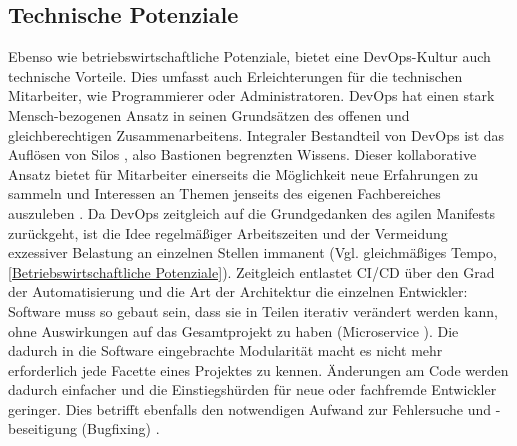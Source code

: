 \subsection{Technische Potenziale}
\label{Technische Potenziale}
Ebenso wie betriebswirtschaftliche Potenziale, bietet eine \gls{DevOps}-Kultur auch technische Vorteile. Dies umfasst auch Erleichterungen für die technischen Mitarbeiter, wie Programmierer oder Administratoren. \gls{DevOps} hat einen stark Mensch-bezogenen Ansatz in seinen Grundsätzen des offenen und gleichberechtigen Zusammenarbeitens. Integraler Bestandteil von \gls{DevOps} ist das Auflösen von \glqq{}Silos\grqq{} \cite{leite_survey_2020}, also Bastionen begrenzten Wissens. Dieser kollaborative Ansatz bietet für Mitarbeiter einerseits die Möglichkeit neue Erfahrungen zu sammeln und Interessen an Themen jenseits des eigenen Fachbereiches auszuleben \cite{leite_survey_2020}. Da \gls{DevOps} zeitgleich auf die Grundgedanken des agilen Manifests zurückgeht, ist die Idee regelmäßiger Arbeitszeiten und der Vermeidung exzessiver Belastung an einzelnen Stellen immanent (Vgl. \glqq{}gleichmäßiges Tempo\grqq{}, \ref{Betriebswirtschaftliche Potenziale}).
Zeitgleich entlastet \acrshort{CI}/\acrshort{CD} über den Grad der Automatisierung und die Art der Architektur die einzelnen Entwickler: Software muss so gebaut sein, dass sie in Teilen iterativ verändert werden kann, ohne Auswirkungen auf das Gesamtprojekt zu haben (\glqq{}Microservice\grqq{} \cite[S. 14]{leite_survey_2020}). Die dadurch in die Software eingebrachte Modularität macht es nicht mehr erforderlich jede Facette eines Projektes zu kennen. Änderungen am Code werden dadurch einfacher und die Einstiegshürden für neue oder fachfremde Entwickler geringer. Dies betrifft ebenfalls den notwendigen Aufwand zur Fehlersuche und -beseitigung (Bugfixing) \cite{hilton_usage_2016}.

